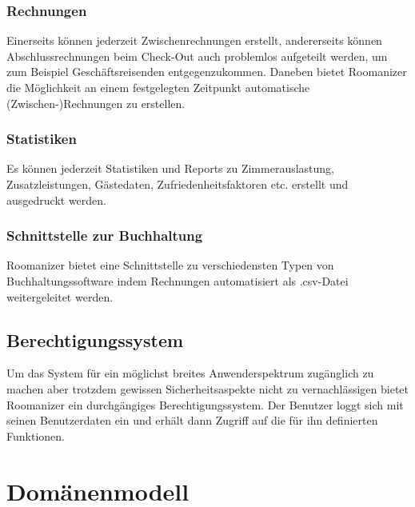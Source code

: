 \documentclass[10pt,a4paper,titlepage]{article}
\begin{document}
\subsubsection{Rechnungen}
Einerseits können jederzeit Zwischenrechnungen erstellt, andererseits können Abschlussrechnungen beim Check-Out auch problemlos aufgeteilt werden, um zum Beispiel Geschäftsreisenden entgegenzukommen. Daneben bietet Roomanizer die Möglichkeit an einem festgelegten Zeitpunkt automatische (Zwischen-)Rechnungen zu erstellen. 

\subsubsection{Statistiken}
Es können jederzeit Statistiken und Reports zu Zimmerauslastung, Zusatzleistungen, Gästedaten, Zufriedenheitsfaktoren etc. erstellt und ausgedruckt werden.

\subsubsection{Schnittstelle zur Buchhaltung}
Roomanizer bietet eine Schnittstelle zu verschiedensten Typen von Buchhaltungssoftware indem Rechnungen automatisiert als .csv-Datei weitergeleitet werden.

\subsection{Berechtigungssystem}
Um das System für ein möglichst breites Anwenderspektrum zugänglich zu machen aber trotzdem gewissen Sicherheitsaspekte nicht zu vernachlässigen bietet Roomanizer ein durchgängiges Berechtigungssystem. Der Benutzer loggt sich mit seinen Benutzerdaten ein und erhält dann Zugriff auf die für ihn definierten Funktionen.

\newpage

\section{Domänenmodell}
\end{document}
